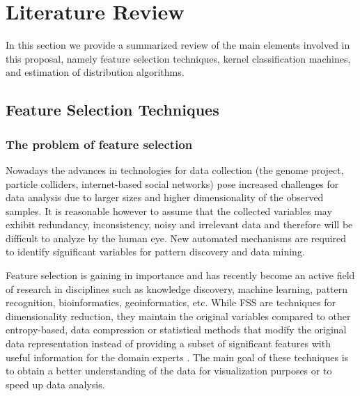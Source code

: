 
\section{Literature Review}
\label{sec:lecrev}
In this section we provide a summarized review of the main elements involved in this proposal, namely feature selection techniques, kernel classification machines, and estimation of distribution algorithms.

\subsection{Feature Selection Techniques}
\label{sec:feat1}
\subsubsection{The problem of feature selection}
\label{sec:feat11}
Nowadays the advances in technologies for data collection (the genome project, particle colliders, internet-based social networks) pose increased challenges for data analysis due to larger sizes and higher dimensionality of the observed samples.  It is reasonable however to assume that the collected variables may exhibit redundancy, inconsistency, noisy and irrelevant data and therefore will be difficult to analyze by the human eye. New automated mechanisms are required to identify significant variables for pattern discovery and data mining.

Feature selection is gaining in importance and has recently become an active field of research in disciplines such as knowledge discovery, machine learning, pattern recognition, bioinformatics, geoinformatics, etc.  While FSS are techniques for dimensionality reduction, they maintain the original variables compared to other entropy-based, data compression or statistical methods that modify the original data representation instead of providing a subset of significant features with useful information for the domain experts \cite{larranaga07}. The main goal of these techniques is to obtain a better understanding of the data for visualization purposes or to speed up data analysis.

